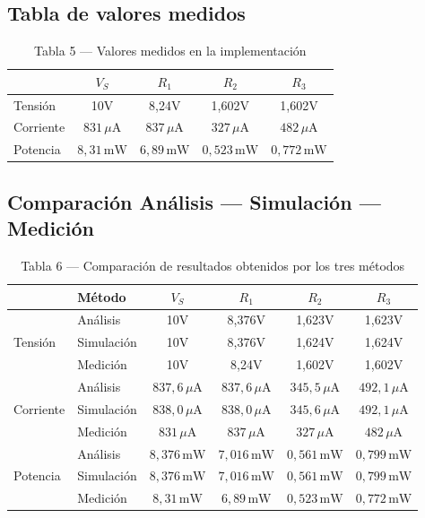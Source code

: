 \documentclass[12pt,a4paper]{article}
\begin{document}
\subsection{Tabla de valores medidos}
 
\begin{table}[H]
\centering
\caption{Tabla 5 --- Valores medidos en la implementación}
\renewcommand{\arraystretch}{1.5}
\begin{tabular}{lcccc}
\toprule
 & $V_S$ & $R_1$ & $R_2$ & $R_3$ \\
\midrule
Tensión   & 10V & 8,24V & 1,602V & 1,602V \\
 Corriente   & $831\,\mu\text{A}$ & $837\,\mu\text{A}$ & $327\,\mu\text{A}$ & $482\,\mu\text{A}$ \\
 Potencia    & $8{,}31\,\text{mW}$ & $6{,}89\,\text{mW}$ & $0{,}523\,\text{mW}$ & $0{,}772\,\text{mW}$ \\
\bottomrule
\end{tabular}
\end{table}
 
\subsection{Comparación Análisis --- Simulación --- Medición}
 
\begin{table}[H]
\centering
\caption{Tabla 6 --- Comparación de resultados obtenidos por los tres métodos}
\renewcommand{\arraystretch}{1.5}
\begin{tabular}{llcccc}
\toprule
 & Método & $V_S$ & $R_1$ & $R_2$ & $R_3$ \\
\midrule
\multirow{3}{*}{Tensión}
    & Análisis   & 10V & 8,376V & 1,623V & 1,623V \\
    & Simulación & 10V & 8,376V & 1,624V & 1,624V \\
    & Medición   & 10V & 8,24V & 1,602V & 1,602V \\
\midrule
\multirow{3}{*}{Corriente}
    & Análisis    &  $837{,}6\,\mu\text{A}$ & $837{,}6\,\mu\text{A}$ & $345{,}5\,\mu\text{A}$ & $492{,}1\,\mu\text{A}$ \\
    & Simulación & $838{,}0\,\mu\text{A}$ & $838{,}0\,\mu\text{A}$ & $345{,}6\,\mu\text{A}$ & $492{,}1\,\mu\text{A}$ \\
    & Medición   & $831\,\mu\text{A}$ & $837\,\mu\text{A}$ & $327\,\mu\text{A}$ & $482\,\mu\text{A}$ \\
\midrule
\multirow{3}{*}{Potencia}
    & Análisis   &  $8{,}376\,\text{mW}$ & $7{,}016\,\text{mW}$  & $0{,}561\,\text{mW}$ & $0{,}799\,\text{mW}$ \\
    & Simulación & $8{,}376\,\text{mW}$ & $7{,}016\,\text{mW}$ & $0{,}561\,\text{mW}$ & $0{,}799\,\text{mW}$ \\
    & Medición   & $8{,}31\,\text{mW}$ & $6{,}89\,\text{mW}$ & $0{,}523\,\text{mW}$ & $0{,}772\,\text{mW}$ \\
\bottomrule
\end{tabular}
\end{table}
 
\end{document}
